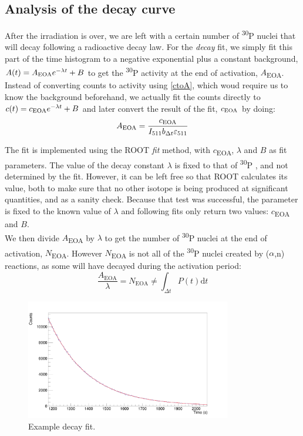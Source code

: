\documentclass[a4paper,12pt]{report}
\newcommand{\dif}{\text{d}}
\newcommand{\an}{($\alpha$,n) }
\newcommand{\Piso}{\textsuperscript{30}P }
\begin{document}
\subsection{Analysis of the decay curve}
After the irradiation is over, we are left with a certain number of \Piso nuclei that will decay following a radioactive decay law.
For the \textit{decay} fit, we simply fit this part of the time histogram to a negative exponential plus a constant background, $A(t) = A\textsubscript{EOA} e^{-\lambda t} + B$ to get the \Piso activity at the end of activation, $A$\textsubscript{EOA}.
Instead of converting counts to activity using \ref{ctoA}, which woud require us to know the background beforehand, we actually fit the counts directly to $c(t) = c\textsubscript{EOA} e^{-\lambda t} + B$ and later convert the result of the fit, $c\textsubscript{EOA}$ by doing:
\begin{equation}
	A\textsubscript{EOA} = \frac{c\textsubscript{EOA}}{I_{511} b_{\Delta t} \varepsilon_{511}}
\end{equation}

The fit is implemented using the ROOT \textit{fit} method, with $c$\textsubscript{EOA}, $\lambda$ and $B$ as fit parameters.
The value of the decay constant $\lambda$ is fixed to that of \Piso, and not determined by the fit.
However, it can be left free so that ROOT calculates its value, both to make sure that no other isotope is being produced at significant quantities, and as a sanity check.
Because that test was successful, the parameter is fixed to the known value of $\lambda$ and following fits only return two values: $c$\textsubscript{EOA} and $B$.
\\

We then divide $A$\textsubscript{EOA} by $\lambda$ to get the number of \Piso nuclei at the end of activation, $N$\textsubscript{EOA}.
However $N$\textsubscript{EOA} is not all of the \Piso nuclei created by \an reactions, as some will have decayed during the activation period:
\[ \frac{A_\text{EOA}}{\lambda} = N_\text{EOA} \neq \int_{\Delta t}P(t) \dif t \]

\begin{figure}[H]
	\centering
	\includegraphics[width=0.80\textwidth]{example_decay_fit.png}
	\caption{Example decay fit.}
	\label{example_decay_fit}
\end{figure}
\end{document}
